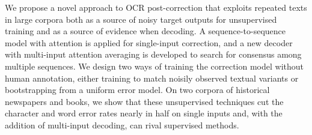 We propose a novel approach to OCR post-correction that exploits repeated texts in large corpora both as a source of noisy target outputs for unsupervised training and as a source of evidence when decoding. A sequence-to-sequence model with attention is applied for single-input correction, and a new decoder with multi-input attention averaging is developed to search for consensus among multiple sequences. We design two ways of training the correction model without human annotation, either training to match noisily observed textual variants or bootstrapping from a uniform error model. On two corpora of historical newspapers and books, we show that these unsupervised techniques cut the character and word error rates nearly in half on single inputs and, with the addition of multi-input decoding, can rival supervised methods.
